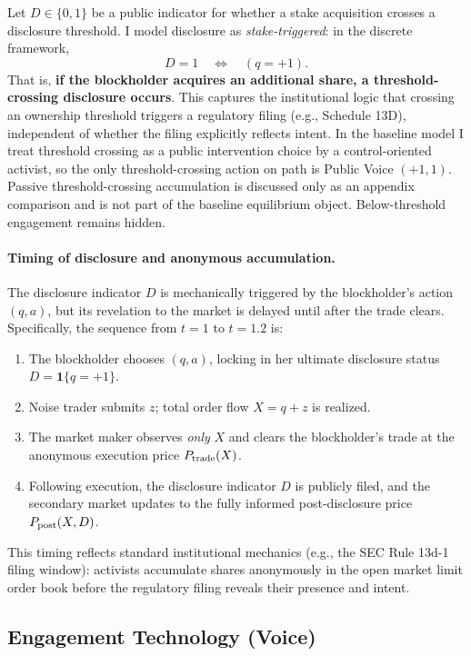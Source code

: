 \documentclass[11pt]{article}
\newcommand{\1}{\mathbf{1}}
\begin{document}
Let $D \in \{0, 1\}$ be a public indicator for whether a stake acquisition crosses a disclosure threshold. I model disclosure as \emph{stake-triggered}: in the discrete framework,
\[
D = 1 \quad \Longleftrightarrow \quad (q = +1).
\]
That is, \textbf{if the blockholder acquires an additional share, a threshold-crossing disclosure occurs}. This captures the institutional logic that crossing an ownership threshold triggers a regulatory filing (e.g., Schedule 13D), independent of whether the filing explicitly reflects intent. In the baseline model I treat threshold crossing as a public intervention choice by a control-oriented activist, so the only threshold-crossing action on path is Public Voice $(+1,1)$. Passive threshold-crossing accumulation is discussed only as an appendix comparison and is not part of the baseline equilibrium object. Below-threshold engagement remains hidden.

\paragraph{Timing of disclosure and anonymous accumulation.} The disclosure indicator $D$ is mechanically triggered by the blockholder's action $(q, a)$, but its revelation to the market is delayed until after the trade clears. Specifically, the sequence from $t=1$ to $t=1.2$ is:
\begin{enumerate}[label=(\roman*),leftmargin=2em,itemsep=0pt]
\item The blockholder chooses $(q, a)$, locking in her ultimate disclosure status $D = \1\{q=+1\}$.
\item Noise trader submits $z$; total order flow $X = q + z$ is realized.
\item The market maker observes \emph{only} $X$ and clears the blockholder's trade at the anonymous execution price $P_{\textup{trade}}(X)$.
\item Following execution, the disclosure indicator $D$ is publicly filed, and the secondary market updates to the fully informed post-disclosure price $P_{\textup{post}}(X, D)$.
\end{enumerate}
This timing reflects standard institutional mechanics (e.g., the SEC Rule 13d-1 filing window): activists accumulate shares anonymously in the open market limit order book before the regulatory filing reveals their presence and intent.

%
\subsection{Engagement Technology (Voice)}
\label{sec:engagement}
%
\end{document}

